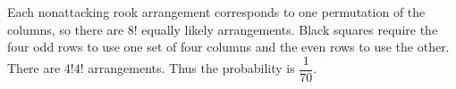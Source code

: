 Each nonattacking rook arrangement corresponds to one permutation of the columns, so there are $8!$ equally likely arrangements. Black squares require the four odd rows to use one set of four columns and the even rows to use the other. There are $4!4!$ arrangements. Thus the probability is $\boxed{\dfrac{1}{70}}$.
